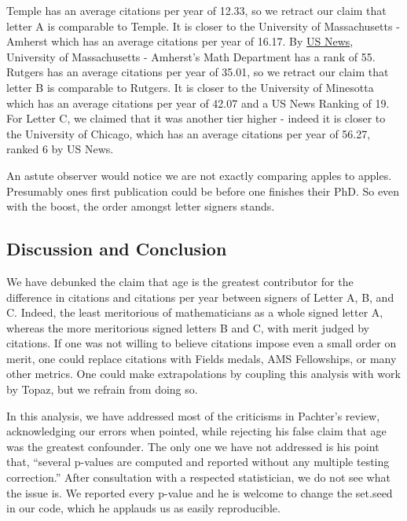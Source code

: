 \documentclass[]{article}
\begin{document}
Temple has an average citations per year of 12.33, so we retract our
claim that letter A is comparable to Temple. It is closer to the
University of Massachusetts - Amherst which has an average citations per
year of 16.17. By
\href{https://www.usnews.com/best-graduate-schools/top-science-schools/mathematics-rankings}{US
News}, University of Massachusetts - Amherst's Math Department has a
rank of 55. Rutgers has an average citations per year of 35.01, so we
retract our claim that letter B is comparable to Rutgers. It is closer
to the University of Minesotta which has an average citations per year
of 42.07 and a US News Ranking of 19. For Letter C, we claimed that it
was another tier higher - indeed it is closer to the University of
Chicago, which has an average citations per year of 56.27, ranked 6 by
US News.

An astute observer would notice we are not exactly comparing apples to
apples. Presumably ones first publication could be before one finishes
their PhD. So even with the boost, the order amongst letter signers
stands.

\hypertarget{discussion-and-conclusion}{%
\subsection{Discussion and Conclusion}\label{discussion-and-conclusion}}

We have debunked the claim that age is the greatest contributor for the
difference in citations and citations per year between signers of Letter
A, B, and C. Indeed, the least meritorious of mathematicians as a whole
signed letter A, whereas the more meritorious signed letters B and C,
with merit judged by citations. If one was not willing to believe
citations impose even a small order on merit, one could replace
citations with Fields medals, AMS Fellowships, or many other metrics.
One could make extrapolations by coupling this analysis with work by
Topaz, but we refrain from doing so.

In this analysis, we have addressed most of the criticisms in Pachter's
review, acknowledging our errors when pointed, while rejecting his false
claim that age was the greatest confounder. The only one we have not
addressed is his point that, ``several p-values are computed and
reported without any multiple testing correction.'' After consultation
with a respected statistician, we do not see what the issue is. We
reported every p-value and he is welcome to change the set.seed in our
code, which he applauds us as easily reproducible.
\end{document}
